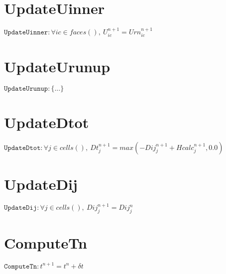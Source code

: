 \documentclass[11pt]{article}
\begin{document}
\section{UpdateUinner}
$\texttt{UpdateUinner} : \forall{ic\in faces()}, \ U^{n+1}_{ic} = Urn^{n+1}_{ic}$


\section{UpdateUrunup}
$\texttt{UpdateUrunup} : \{ ... \}$


\section{UpdateDtot}
$\texttt{UpdateDtot} : \forall{j\in cells()}, \ Dt^{n+1}_{j} = max\left(-Dij^{n+1}_{j} + Hcalc^{n+1}_{j},0.0\right)$


\section{UpdateDij}
$\texttt{UpdateDij} : \forall{j\in cells()}, \ Dij^{n+1}_{j} = Dij^{n}_{j}$


\section{ComputeTn}
$\texttt{ComputeTn} : t^{n+1} = t^{n} + \delta t$
\end{document}

